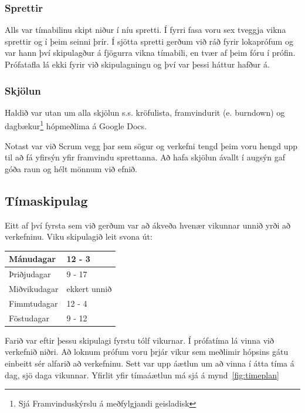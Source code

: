 \documentclass{article}
\begin{document}
\subsubsection{Sprettir}
\label{sec:sprettir}
Alls var tímabilinu skipt niður í níu spretti. Í fyrri fasa voru sex 
tveggja vikna sprettir og í þeim seinni þrír. Í sjötta spretti gerðum við ráð fyrir lokaprófum og var hann því
skipulagður á fjögurra vikna tímabili, 
en tvær af þeim fóru í prófin. Prófatafla lá ekki fyrir við skipulagningu og því 
var þessi háttur hafður á. 


\subsubsection{Skjölun}

Haldið var utan um alla skjölun s.s. kröfulista, framvindurit (e. burndown) og dagbækur\footnote{Sjá Framvinduskýrslu á meðfylgjandi geisladisk}
 hópmeðlima á Google Docs. 

Notast var við Scrum vegg þar sem sögur og verkefni tengd þeim voru hengd upp til að fá yfirsýn 
yfir framvindu sprettanna. Að hafa skjölun ávallt í augsýn gaf góða raun og hélt mönnum við efnið.

\subsection{Tímaskipulag}
Eitt af því fyrsta sem við gerðum var að ákveða hvenær 
vikunnar unnið yrði að verkefninu.
Viku skipulagið leit svona út:

\vspace{5 mm}
\begin{tabular}{| l | l |}
\hline
  Mánudagar & 12 - 3 \\
  \hline
  Þriðjudagar & 9 - 17 \\
  \hline
  Miðvikudagar & ekkert unnið\\
  \hline
  Fimmtudagar & 12 - 4 \\
  \hline
  Föstudagar & 9 - 12\\
\hline
\end{tabular}
\vspace{5 mm}

Farið var eftir þessu skipulagi fyrstu tólf vikurnar. 
Í prófatíma lá vinna við verkefnið niðri. 
Að loknum prófum voru þrjár vikur sem meðlimir hópsins gátu einbeitt sér alfarið
að verkefninu. Sett var upp áætlun um að vinna í átta tíma á dag, sjö daga
vikunnar. Yfirlit yfir tímaáætlun má sjá á mynd~\ref{fig:timeplan}
\end{document}
